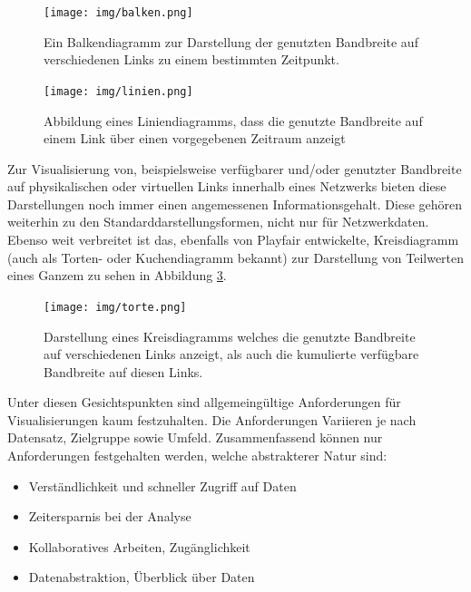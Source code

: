 \documentclass[draft=false
              ,paper=a4
              ,twoside=false
              ,fontsize=11pt
              ,headsepline
              ,BCOR10mm
              ,DIV11
              ]{scrbook}
\newcommand{\TODO}[1]{\colorbox{yellow}{\textcolor{red}{[TODO: #1]}}}
\begin{document}
\begin{figure}[htbp]
  \centering
  \texttt{[image: img/balken.png]}
  \caption{Ein Balkendiagramm zur Darstellung der genutzten Bandbreite auf verschiedenen Links zu einem bestimmten Zeitpunkt.}
  \label{fig:balken}
\end{figure}

\begin{figure}[htbp]
  \centering
  \texttt{[image: img/linien.png]}
  \caption{Abbildung eines Liniendiagramms, dass die genutzte Bandbreite auf einem Link über einen vorgegebenen Zeitraum anzeigt}
  \label{fig:linien}
\end{figure}

Zur Visualisierung von, beispielsweise verfügbarer und/oder genutzter Bandbreite auf physikalischen oder virtuellen Links innerhalb eines Netzwerks bieten diese Darstellungen noch immer einen angemessenen Informationsgehalt. Diese gehören weiterhin zu den Standarddarstellungsformen, nicht nur für Netzwerkdaten. Ebenso weit verbreitet ist das, ebenfalls von Playfair entwickelte, Kreisdiagramm (auch als Torten- oder Kuchendiagramm bekannt) zur Darstellung von Teilwerten eines Ganzem zu sehen in Abbildung \ref{fig:kreis}.

\begin{figure}[htbp]
  \centering
  \texttt{[image: img/torte.png]}
  \caption{Darstellung eines Kreisdiagramms welches die genutzte Bandbreite auf verschiedenen Links anzeigt, als auch die kumulierte verfügbare Bandbreite auf diesen Links.}
  \label{fig:kreis}
\end{figure}

\newpage
Unter diesen Gesichtspunkten sind allgemeingültige Anforderungen für Visualisierungen kaum festzuhalten. Die Anforderungen Variieren je nach Datensatz, Zielgruppe sowie Umfeld. Zusammenfassend können nur Anforderungen festgehalten werden, welche abstrakterer Natur sind:

\begin{itemize}
  \item Verständlichkeit und schneller Zugriff auf Daten
  \item Zeitersparnis bei der Analyse
  \item Kollaboratives Arbeiten, Zugänglichkeit
  \item Datenabstraktion, Überblick über Daten
\end{itemize}
\end{document}
